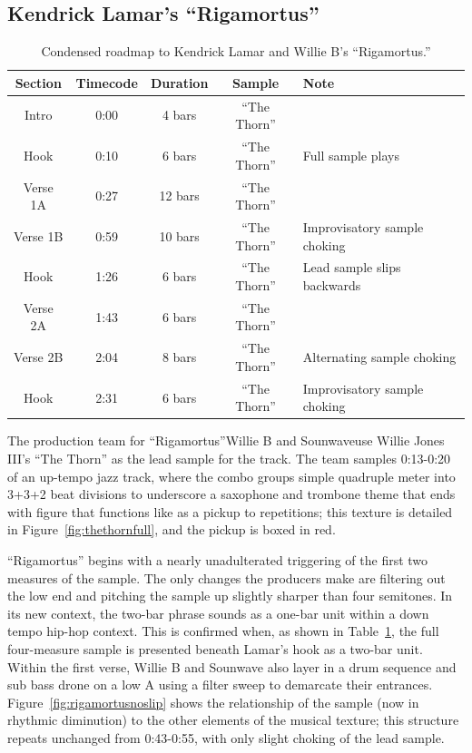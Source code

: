 \subsection*{\centering Kendrick Lamar's ``Rigamortus''}
    \begin{table}[ht]
        \centering
            \begin{tabular}{|c|c|c|c|l|}
                \hline
                Section  & Timecode & Duration & Sample        & Note \\ \hline
                Intro    & 0:00     & 4 bars   & ``The Thorn'' & \\ \hline
                Hook     & 0:10     & 6 bars   & ``The Thorn'' & Full sample plays \\ \hline
                Verse 1A & 0:27     & 12 bars  & ``The Thorn'' & \\ \hline
                Verse 1B & 0:59     & 10 bars  & ``The Thorn'' & Improvisatory sample choking \\ \hline
                Hook     & 1:26     & 6 bars   & ``The Thorn'' & Lead sample slips backwards \\ \hline
                Verse 2A & 1:43     & 6 bars   & ``The Thorn'' & \\ \hline
                Verse 2B & 2:04     & 8 bars   & ``The Thorn'' & Alternating sample choking \\ \hline
                Hook     & 2:31     & 6 bars   & ``The Thorn'' & Improvisatory sample choking\\ \hline
            \end{tabular}
        \caption{Condensed roadmap to Kendrick Lamar and Willie B's ``Rigamortus.''}
        \label{tab:rigamortus}
    \end{table}

The production team for ``Rigamortus''\textemdash Willie B and Sounwave\textemdash use Willie Jones III's ``The Thorn'' as the lead sample for the track. The team samples 0:13-0:20 of an up-tempo jazz track, where the combo groups simple quadruple meter into 3+3+2 beat divisions to underscore a saxophone and trombone theme that ends with figure that functions like as a pickup to repetitions; this texture is detailed in Figure~\ref{fig:thethornfull}, and the pickup is boxed in red.

``Rigamortus'' begins with a nearly unadulterated triggering of the first two measures of the sample. The only changes the producers make are filtering out the low end and pitching the sample up slightly sharper than four semitones. In its new context, the two-bar phrase sounds as a one-bar unit within a down tempo hip-hop context. This is confirmed when, as shown in Table~\ref{tab:rigamortus}, the full four-measure sample is presented beneath Lamar's hook as a two-bar unit. Within the first verse, Willie B and Sounwave also layer in a drum sequence and sub bass drone on a low A using a filter sweep to demarcate their entrances. Figure~\ref{fig:rigamortusnoslip} shows the relationship of the sample (now in rhythmic diminution) to the other elements of the musical texture; this structure repeats unchanged from 0:43-0:55, with only slight choking of the lead sample.


